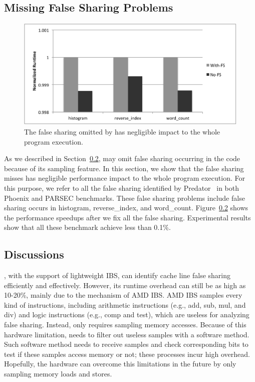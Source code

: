 \subsection{Missing False Sharing Problems}

\begin{figure}[htbp]
\centering
\label{fig:fsinfs}
\includegraphics[width=.8\columnwidth]{figure/trivial}
\caption{The false sharing omitted by \cheetah{} has negligible impact to the whole program execution.}
\end{figure}

As we described in Section~\ref{}, \cheetah{} may omit false sharing occurring in the code because of its sampling feature. In this section, we show that the false sharing \cheetah{} misses has negligible performance impact to the whole program execution.  For this purpose, we refer to all the false sharing identified by Predator~\cite{} in both Phoenix and PARSEC benchmarks. These false sharing problems include false sharing occurs in histogram, reverse\_index, and word\_count. Figure~\ref{} shows the performance speedups after we fix all the false sharing. Experimental results show that all these benchmark achieve less than 0.1\%. 

\subsection{Discussions}

\Cheetah{}, with the support of lightweight IBS, can identify cache line false sharing efficiently and effectively. However, its runtime overhead can still be as high as 10-20\%, mainly due to the mechanism of AMD IBS. AMD IBS samples every kind of instructions, including arithmetic instructions (e.g., add, sub, mul, and div) and logic instructions (e.g., comp and test), which are useless for analyzing false sharing. Instead, \cheetah{} only requires sampling memory accesses. Because of this hardware limitation, \cheetah{} needs to filter out useless samples with a software method. Such software method needs \cheetah{} to receive samples and check corresponding bits to test if these samples access memory or not; these processes incur high overhead. Hopefully, the hardware can overcome this limitations in the future by only sampling memory loads and stores.
